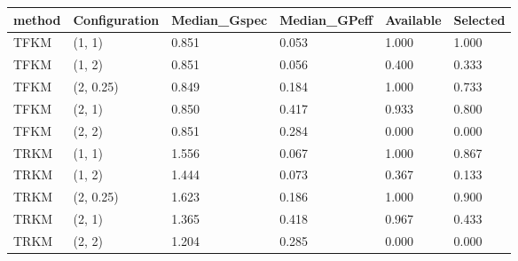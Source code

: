 \begin{tabular}{llllll}
\toprule
method & Configuration & Median\_Gspec & Median\_GPeff & Available & Selected \\
\midrule
TFKM & (1, 1) & 0.851 & 0.053 & 1.000 & 1.000 \\
TFKM & (1, 2) & 0.851 & 0.056 & 0.400 & 0.333 \\
TFKM & (2, 0.25) & 0.849 & 0.184 & 1.000 & 0.733 \\
TFKM & (2, 1) & 0.850 & 0.417 & 0.933 & 0.800 \\
TFKM & (2, 2) & 0.851 & 0.284 & 0.000 & 0.000 \\
TRKM & (1, 1) & 1.556 & 0.067 & 1.000 & 0.867 \\
TRKM & (1, 2) & 1.444 & 0.073 & 0.367 & 0.133 \\
TRKM & (2, 0.25) & 1.623 & 0.186 & 1.000 & 0.900 \\
TRKM & (2, 1) & 1.365 & 0.418 & 0.967 & 0.433 \\
TRKM & (2, 2) & 1.204 & 0.285 & 0.000 & 0.000 \\
\bottomrule
\end{tabular}

